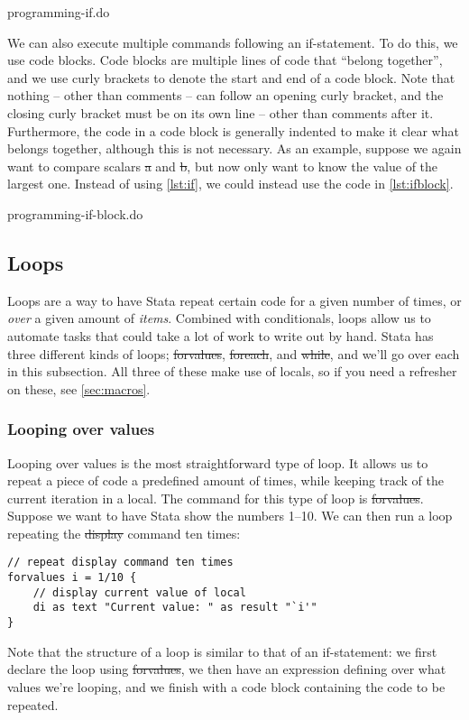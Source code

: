 \begin{listing}[tbp]
\caption{programming-if.do}\label{lst:if}
\end{listing}

We can also execute multiple commands following an if-statement.
To do this, we use code blocks.
Code blocks are multiple lines of code that ``belong together'',
and we use curly brackets to denote the start and end of a code block.
Note that nothing -- other than comments -- can follow an opening curly bracket,
and the closing curly bracket must be on its own line --
other than comments after it.
Furthermore,
the code in a code block is generally indented to make it clear what belongs together,
although this is not necessary.
As an example,
suppose we again want to compare scalars \st{a} and \st{b},
but now only want to know the value of the largest one.
Instead of using \cref{lst:if},
we could instead use the code in \cref{lst:ifblock}.

\begin{listing}[tbp]
\caption{programming-if-block.do}\label{lst:ifblock}
\end{listing}

\subsection{Loops}

Loops are a way to have Stata repeat certain code for a given number of times,
or \emph{over} a given amount of \emph{items}.
Combined with conditionals,
loops allow us to automate tasks that could take a lot of work to write out by hand.
Stata has three different kinds of loops;
\st{forvalues}, \st{foreach}, and \st{while},
and we'll go over each in this subsection.
All three of these make use of locals,
so if you need a refresher on these,
see \cref{sec:macros}.

\subsubsection{Looping over values}

Looping over values is the most straightforward type of loop.
It allows us to repeat a piece of code a predefined amount of times,
while keeping track of the current iteration in a local.
The command for this type of loop is \st{forvalues}.
Suppose we want to have Stata show the numbers 1--10.
We can then run a loop repeating the \st{display} command ten times:
\begin{verbatim}
// repeat display command ten times
forvalues i = 1/10 {
    // display current value of local
    di as text "Current value: " as result "`i'"
}
\end{verbatim}
Note that the structure of a loop is similar to that of an if-statement:
we first declare the loop using \st{forvalues},
we then have an expression defining over what values we're looping,
and we finish with a code block containing the code to be repeated.

